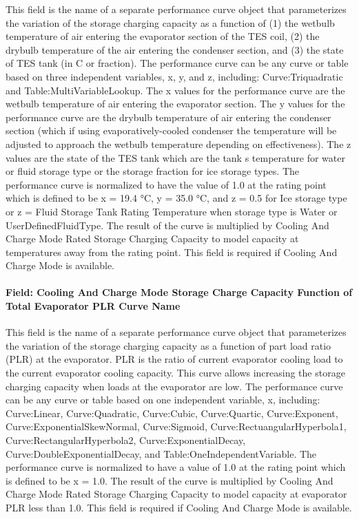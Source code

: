 This field is the name of a separate performance curve object that parameterizes the variation of the storage charging capacity as a function of (1) the wetbulb temperature of air entering the evaporator section of the TES coil, (2) the drybulb temperature of the air entering the condenser section, and (3) the state of TES tank (in C or fraction). The performance curve can be any curve or table based on three independent variables, x, y, and z, including: Curve:Triquadratic and Table:MultiVariableLookup. The x values for the performance curve are the wetbulb temperature of air entering the evaporator section. The y values for the performance curve are the drybulb temperature of air entering the condenser section (which if using evaporatively-cooled condenser the temperature will be adjusted to approach the wetbulb temperature depending on effectiveness). The z values are the state of the TES tank which are the tank s temperature for water or fluid storage type or the storage fraction for ice storage types. The performance curve is normalized to have the value of 1.0 at the rating point which is defined to be x = 19.4 °C, y = 35.0 °C, and z = 0.5 for Ice storage type or z = Fluid Storage Tank Rating Temperature when storage type is Water or UserDefinedFluidType. The result of the curve is multiplied by Cooling And Charge Mode Rated Storage Charging Capacity to model capacity at temperatures away from the rating point. This field is required if Cooling And Charge Mode is available.

\paragraph{Field: Cooling And Charge Mode Storage Charge Capacity Function of Total Evaporator PLR Curve Name}\label{field-cooling-and-charge-mode-storage-charge-capacity-function-of-total-evaporator-plr-curve-name}

This field is the name of a separate performance curve object that parameterizes the variation of the storage charging capacity as a function of part load ratio (PLR) at the evaporator. PLR is the ratio of current evaporator cooling load to the current evaporator cooling capacity. This curve allows increasing the storage charging capacity when loads at the evaporator are low. The performance curve can be any curve or table based on one independent variable, x, including: Curve:Linear, Curve:Quadratic, Curve:Cubic, Curve:Quartic, Curve:Exponent, Curve:ExponentialSkewNormal, Curve:Sigmoid, Curve:RectuangularHyperbola1, Curve:RectangularHyperbola2, Curve:ExponentialDecay, Curve:DoubleExponentialDecay, and Table:OneIndependentVariable. The performance curve is normalized to have a value of 1.0 at the rating point which is defined to be x = 1.0. The result of the curve is multiplied by Cooling And Charge Mode Rated Storage Charging Capacity to model capacity at evaporator PLR less than 1.0. This field is required if Cooling And Charge Mode is available.

